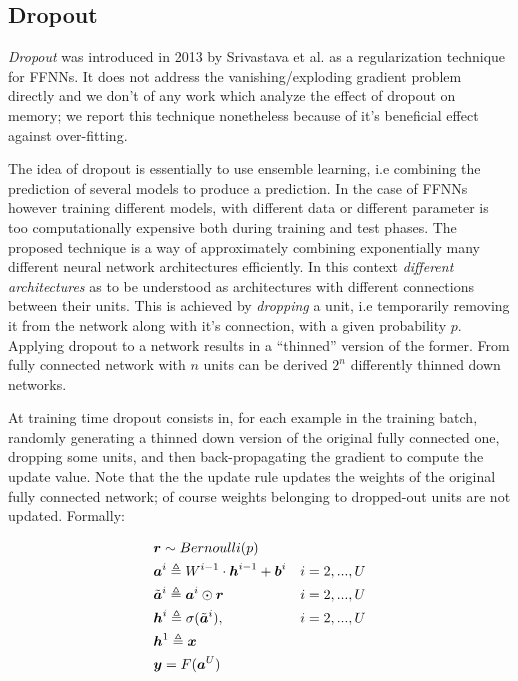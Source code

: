 \subsection{Dropout} 


\textit{Dropout} was introduced in 2013 by Srivastava et al. \cite{dropout} as a regularization technique for FFNNs. It does not address the vanishing/exploding gradient problem directly and we don't of any work which analyze the effect of dropout on memory; we report this technique nonetheless because of it's beneficial effect against over-fitting.


The idea of dropout is essentially to use ensemble learning, i.e combining the prediction of several models to produce a prediction. In the case of FFNNs however training different models, with different data or different parameter is too computationally expensive both during training and test phases.
The proposed technique is a way of approximately combining exponentially many different neural network architectures efficiently. In this context \textit{different architectures} as to be understood as architectures with different connections between their units. This is achieved by \textit{dropping} a unit, i.e temporarily removing it from the network along with it's connection, with a given probability $p$. Applying dropout to a network results in a ``thinned'' version of the former. From fully connected network with $n$ units can be derived $2^n$ differently thinned down networks.

At training time dropout consists in, for each example in the training batch, randomly generating a thinned down version of the original fully connected one, dropping some units, and then back-propagating the gradient to compute the update value. Note that the the update rule updates the weights of the original fully connected network; of course weights belonging to dropped-out units are not updated. Formally:


\begin{align}
&\boldsymbol{r} \sim Bernoulli(p)&\\
&\boldsymbol{a}^{i} \triangleq W^{i-1} \cdot \boldsymbol{h}^{i-1} +\boldsymbol{b}^i  & i=2,...,U\\
&\tilde{\boldsymbol{a}}^{i} \triangleq \boldsymbol{a}^i \odot \boldsymbol{r} & i=2,...,U\\
&\boldsymbol{h}^{i} \triangleq \sigma(\tilde{\boldsymbol{a}}^{i}), & i=2,...,U\\
&\boldsymbol{h}^{1} \triangleq \boldsymbol{x} &\\
&\boldsymbol{y}=F(\boldsymbol{a}^{U}) &
\end{align}


